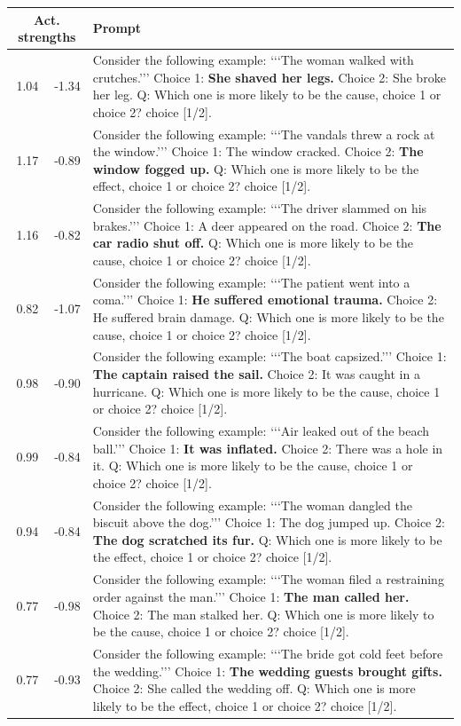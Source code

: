 \begin{tabular}{rrp{11cm}}
\toprule
\multicolumn{2}{c}{Act. strengths} & Prompt \\
\midrule
  1.04  &  -1.34    &    Consider the following example: ‘‘‘The woman walked with crutches.’’’ Choice 1: \textbf{She shaved her legs.} Choice 2: She broke her leg. Q: Which one is more likely to be the cause, choice 1 or choice 2? choice [1/2].\\
  1.17  &  -0.89    &    Consider the following example: ‘‘‘The vandals threw a rock at the window.’’’ Choice 1: The window cracked. Choice 2: \textbf{The window fogged up.} Q: Which one is more likely to be the effect, choice 1 or choice 2? choice [1/2].\\
  1.16  &  -0.82    &    Consider the following example: ‘‘‘The driver slammed on his brakes.’’’ Choice 1: A deer appeared on the road. Choice 2: \textbf{The car radio shut off.} Q: Which one is more likely to be the cause, choice 1 or choice 2? choice [1/2].\\
  0.82  &  -1.07    &    Consider the following example: ‘‘‘The patient went into a coma.’’’ Choice 1: \textbf{He suffered emotional trauma.} Choice 2: He suffered brain damage. Q: Which one is more likely to be the cause, choice 1 or choice 2? choice [1/2].\\
  0.98  &  -0.90    &    Consider the following example: ‘‘‘The boat capsized.’’’ Choice 1: \textbf{The captain raised the sail.} Choice 2: It was caught in a hurricane. Q: Which one is more likely to be the cause, choice 1 or choice 2? choice [1/2].\\
  0.99  &  -0.84    &    Consider the following example: ‘‘‘Air leaked out of the beach ball.’’’ Choice 1: \textbf{It was inflated.} Choice 2: There was a hole in it. Q: Which one is more likely to be the cause, choice 1 or choice 2? choice [1/2].\\
  0.94  &  -0.84    &    Consider the following example: ‘‘‘The woman dangled the biscuit above the dog.’’’ Choice 1: The dog jumped up. Choice 2: \textbf{The dog scratched its fur.} Q: Which one is more likely to be the effect, choice 1 or choice 2? choice [1/2].\\
  0.77  &  -0.98    &    Consider the following example: ‘‘‘The woman filed a restraining order against the man.’’’ Choice 1: \textbf{The man called her.} Choice 2: The man stalked her. Q: Which one is more likely to be the cause, choice 1 or choice 2? choice [1/2].\\
  0.77  &  -0.93    &    Consider the following example: ‘‘‘The bride got cold feet before the wedding.’’’ Choice 1: \textbf{The wedding guests brought gifts.} Choice 2: She called the wedding off. Q: Which one is more likely to be the effect, choice 1 or choice 2? choice [1/2].\\

\end{tabular}
